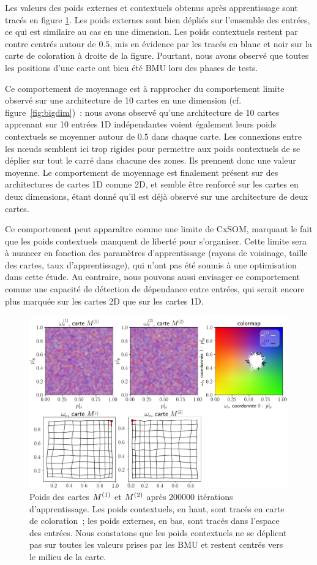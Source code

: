 \documentclass[../main]{subfiles}
\begin{document}
Les valeurs des poids externes et contextuels obtenus après apprentissage sont tracés en figure \ref{fig:2som_cub_wc}.
Les poids externes sont bien dépliés sur l'ensemble des entrées, ce qui est similaire au cas en une dimension.
Les poids contextuels restent par contre centrés autour de $0.5$, mis en évidence par les tracés en blanc et noir sur la carte de coloration à droite de la figure.
Pourtant, nous avons observé que toutes les positions d'une carte ont bien été BMU lors des phases de tests.

Ce comportement de moyennage est à rapprocher du comportement limite observé sur une architecture de 10 cartes en une dimension (cf. figure~\ref{fig:bigdim})~: nous avons observé qu'une architecture de 10 cartes apprenant sur 10 entrées 1D indépendantes voient également leurs poids contextuels se moyenner autour de $0.5$ dans chaque carte.
Les connexions entre les n\oe{}uds semblent ici trop rigides pour permettre aux poids contextuels de se déplier sur tout le carré dans chacune des zones. Ils prennent donc une valeur moyenne.
Le comportement de moyennage est finalement présent sur des architectures de cartes 1D comme 2D, et semble être renforcé sur les cartes en deux dimensions, étant donné qu'il est déjà observé sur une architecture de deux cartes.

Ce comportement peut apparaître comme une limite de CxSOM, marquant le fait que les poids contextuels manquent de liberté pour s'organiser. Cette limite sera à nuancer en fonction des paramètres d'apprentissage (rayons de voisinage, taille des cartes, taux d'apprentissage), qui n'ont pas été soumis à une optimisation dans cette étude.
Au contraire, nous pouvons aussi envisager ce comportement comme une capacité de détection de dépendance entre entrées, qui serait encore plus marquée sur les cartes 2D que sur les cartes 1D. 

\begin{figure}
	\centering\includegraphics[width=\textwidth]{w_cub_rc002.pdf}
	\caption{Poids des cartes $M^{({1})}$ et $M^{({2})}$ après 200000 itérations d'apprentissage. Les poids contextuels, en haut, sont tracés en carte de coloration~; les poids externes, en bas, sont tracés dans l'espace des entrées.
	Nous constatons que les poids contextuels ne se déplient pas sur toutes les valeurs prises par les BMU et restent centrés vers le milieu de la carte. \label{fig:2som_cub_wc}}
\end{figure}
\end{document}

